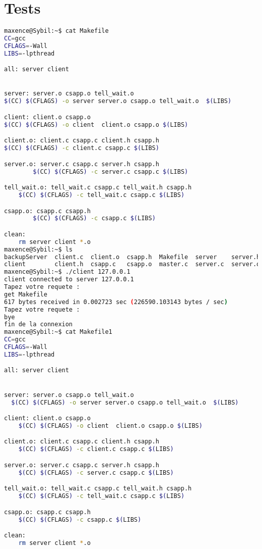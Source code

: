 \documentclass{report}
\begin{document}
      \section{Tests}
\begin{lstlisting}[frame=single,basicstyle=\footnotesize,language=bash]
maxence@Sybil:~$ cat Makefile
CC=gcc
CFLAGS=-Wall
LIBS=-lpthread

all: server client


server: server.o csapp.o tell_wait.o
$(CC) $(CFLAGS) -o server server.o csapp.o tell_wait.o  $(LIBS)

client: client.o csapp.o
$(CC) $(CFLAGS) -o client  client.o csapp.o $(LIBS)

client.o: client.c csapp.c client.h csapp.h
$(CC) $(CFLAGS) -c client.c csapp.c $(LIBS)

server.o: server.c csapp.c server.h csapp.h
		$(CC) $(CFLAGS) -c server.c csapp.c $(LIBS)

tell_wait.o: tell_wait.c csapp.c tell_wait.h csapp.h
	$(CC) $(CFLAGS) -c tell_wait.c csapp.c $(LIBS)

csapp.o: csapp.c csapp.h
		$(CC) $(CFLAGS) -c csapp.c $(LIBS)

clean:
  	rm server client *.o
maxence@Sybil:~$ ls
backupServer  client.c  client.o  csapp.h  Makefile  server    server.h  tell_wait.c  tell_wait.o  test_pipe.c
client        client.h  csapp.c   csapp.o  master.c  server.c  server.o  tell_wait.h  test
maxence@Sybil:~$ ./client 127.0.0.1
client connected to server 127.0.0.1
Tapez votre requete :
get Makefile
617 bytes received in 0.002723 sec (226590.103143 bytes / sec)
Tapez votre requete :
bye
fin de la connexion
maxence@Sybil:~$ cat Makefile1
CC=gcc
CFLAGS=-Wall
LIBS=-lpthread

all: server client


server: server.o csapp.o tell_wait.o
  $(CC) $(CFLAGS) -o server server.o csapp.o tell_wait.o  $(LIBS)

client: client.o csapp.o
	$(CC) $(CFLAGS) -o client  client.o csapp.o $(LIBS)

client.o: client.c csapp.c client.h csapp.h
	$(CC) $(CFLAGS) -c client.c csapp.c $(LIBS)

server.o: server.c csapp.c server.h csapp.h
	$(CC) $(CFLAGS) -c server.c csapp.c $(LIBS)

tell_wait.o: tell_wait.c csapp.c tell_wait.h csapp.h
	$(CC) $(CFLAGS) -c tell_wait.c csapp.c $(LIBS)

csapp.o: csapp.c csapp.h
	$(CC) $(CFLAGS) -c csapp.c $(LIBS)

clean:
	rm server client *.o
\end{lstlisting}
\end{document}

